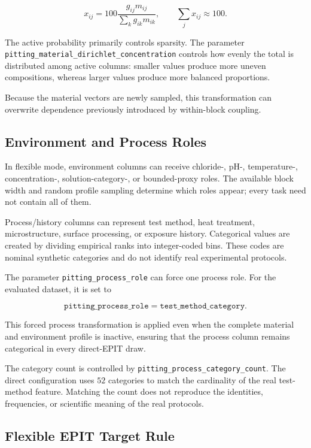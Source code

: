 \documentclass{article}
\begin{document}
\begin{equation}
x_{ij}
=
100\frac{g_{ij}m_{ij}}{\sum_k g_{ik}m_{ik}},
\qquad
\sum_jx_{ij}\approx100.
\label{eq:masked-dirichlet}
\end{equation}

The active probability primarily controls sparsity. The parameter
\texttt{pitting\_material\_dirichlet\_concentration} controls how evenly the total is distributed among active columns: smaller values produce more uneven compositions, whereas larger values produce more balanced proportions.

Because the material vectors are newly sampled, this transformation can overwrite dependence previously introduced by within-block coupling.

\subsection{Environment and Process Roles}

In flexible mode, environment columns can receive chloride-, pH-, temperature-, concentration-, solution-category-, or bounded-proxy roles. The available block width and random profile sampling determine which roles appear; every task need not contain all of them.

Process/history columns can represent test method, heat treatment, microstructure, surface processing, or exposure history. Categorical values are created by dividing empirical ranks into integer-coded bins. These codes are nominal synthetic categories and do not identify real experimental protocols.

The parameter \texttt{pitting\_process\_role} can force one process role. For the evaluated dataset, it is set to

\[
\texttt{pitting\_process\_role}
=
\texttt{test\_method\_category}.
\]

This forced process transformation is applied even when the complete material and environment profile is inactive, ensuring that the process column remains categorical in every direct-EPIT draw.

The category count is controlled by
\texttt{pitting\_process\_category\_count}. The direct configuration uses \(52\) categories to match the cardinality of the real test-method feature. Matching the count does not reproduce the identities, frequencies, or scientific meaning of the real protocols.

\subsection{Flexible EPIT Target Rule}
\end{document}
